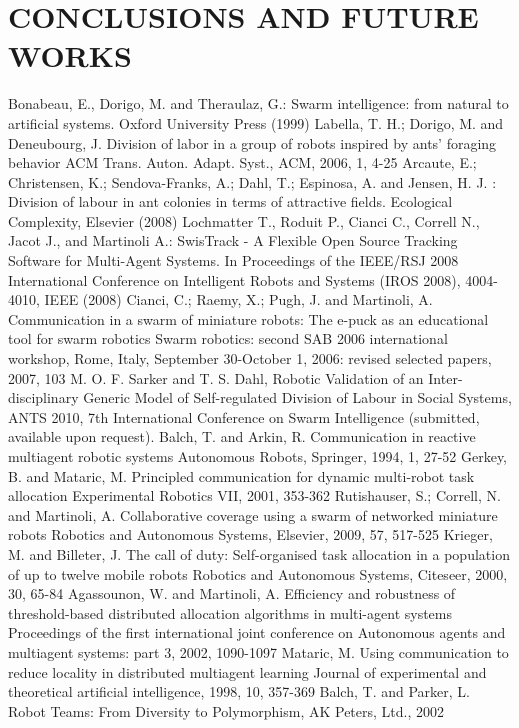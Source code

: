 \documentclass[letterpaper, 10 pt, conference]{ieeeconf}  %
\begin{document}
\section{CONCLUSIONS AND FUTURE WORKS}
\label{sec:conc}
\begin{thebibliography}{99}
Bonabeau, E., Dorigo, M. and Theraulaz, G.:
Swarm intelligence: from natural to artificial systems.
Oxford University Press (1999)
Labella, T. H.; Dorigo, M. and Deneubourg, J. Division of labor in a group of robots inspired by ants' foraging behavior ACM Trans. Auton. Adapt. Syst., ACM, 2006, 1, 4-25
Arcaute, E.; Christensen, K.; Sendova-Franks, A.; Dahl, T.; Espinosa, A. and Jensen, H. J. : 
Division of labour in ant colonies in terms of attractive fields. 
Ecological Complexity, Elsevier (2008)
Lochmatter T., Roduit P., Cianci C., Correll N., Jacot J., and Martinoli A.: 
SwisTrack - A Flexible Open Source Tracking Software for Multi-Agent Systems. 
In Proceedings of the IEEE/RSJ 2008 International Conference on Intelligent Robots and Systems (IROS 2008), 4004-4010, IEEE (2008)
Cianci, C.; Raemy, X.; Pugh, J. and Martinoli, A. Communication in a swarm of miniature robots: The e-puck as an educational tool for swarm robotics Swarm robotics: second SAB 2006 international workshop, Rome, Italy, September 30-October 1, 2006: revised selected papers, 2007, 103
M. O. F. Sarker and T. S. Dahl, Robotic Validation of an Inter-disciplinary Generic
Model of Self-regulated Division of Labour in Social Systems, ANTS 2010, 7th International Conference on Swarm Intelligence (submitted, available upon request).
Balch, T. and Arkin, R. Communication in reactive multiagent robotic systems Autonomous Robots, Springer, 1994, 1, 27-52
Gerkey, B. and Mataric, M. Principled communication for dynamic multi-robot task allocation Experimental Robotics VII, 2001, 353-362
Rutishauser, S.; Correll, N. and Martinoli, A. Collaborative coverage using a swarm of networked miniature robots Robotics and Autonomous Systems, Elsevier, 2009, 57, 517-525
Krieger, M. and Billeter, J. The call of duty: Self-organised task allocation in a population of up to twelve mobile robots Robotics and Autonomous Systems, Citeseer, 2000, 30, 65-84
Agassounon, W. and Martinoli, A. Efficiency and robustness of threshold-based distributed allocation algorithms in multi-agent systems Proceedings of the first international joint conference on Autonomous agents and multiagent systems: part 3, 2002, 1090-1097
Mataric, M. Using communication to reduce locality in distributed multiagent learning Journal of experimental and theoretical artificial intelligence, 1998, 10, 357-369
Balch, T. and Parker, L. Robot Teams: From Diversity to Polymorphism, AK Peters, Ltd., 2002


\end{thebibliography}
\end{document}
